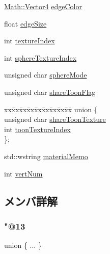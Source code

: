 \begin{DoxyCompactItemize}
\begin{tabbing}
\end{tabbing}\item 
\mbox{\hyperlink{struct_math_1_1_vector4}{Math\+::\+Vector4}} \mbox{\hyperlink{struct_p_m_x_1_1_material_a0a38dda2f8f4c8e3300440f8994d1f04}{edge\+Color}}
\item 
float \mbox{\hyperlink{struct_p_m_x_1_1_material_a6c2455fd8c8d9fb1119f6414403d3bfc}{edge\+Size}}
\item 
int \mbox{\hyperlink{struct_p_m_x_1_1_material_a63445e73472c6ce7d27124fcde258d0c}{texture\+Index}}
\item 
int \mbox{\hyperlink{struct_p_m_x_1_1_material_a471ce9387638006631f51ad5e99266c6}{sphere\+Texture\+Index}}
\item 
unsigned char \mbox{\hyperlink{struct_p_m_x_1_1_material_a692ac4dc28f8464a47514956ef2ef823}{sphere\+Mode}}
\item 
unsigned char \mbox{\hyperlink{struct_p_m_x_1_1_material_a40219016cd5c53b5fbc0971082356541}{share\+Toon\+Flag}}
\item 
\begin{tabbing}
xx\=xx\=xx\=xx\=xx\=xx\=xx\=xx\=xx\=\kill
union \{\\
\>unsigned char \mbox{\hyperlink{struct_p_m_x_1_1_material_a473e078fff9dbb1b254e7ca46d54e3b5}{shareToonTexture}}\\
\>int \mbox{\hyperlink{struct_p_m_x_1_1_material_a6cba97d8eeef2018bd9df399700a89ed}{toonTextureIndex}}\\
\}; \\

\end{tabbing}\item 
std\+::wstring \mbox{\hyperlink{struct_p_m_x_1_1_material_a0487fa545abd565782b278aedfe0af4a}{material\+Memo}}
\item 
int \mbox{\hyperlink{struct_p_m_x_1_1_material_aebb484136d9fb16d40ad119c78bc71d4}{vert\+Num}}
\end{DoxyCompactItemize}


\subsection{メンバ詳解}
\mbox{\label{struct_p_m_x_1_1_material_ab1d556aa6dc492a23a011abe8c806391}} 
\subsubsection{\texorpdfstring{"@13}{@13}}
{\footnotesize\ttfamily union \{ ... \} }

